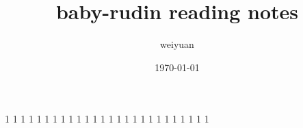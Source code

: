 
\title{baby-rudin reading notes}
\author{weiyuan}
\date{\today}


    \frontmatter
    \maketitle
    \tableofcontents
    \mainmatter
    
    
    
    
    
    
    
    
    
    
    
    
    
    1\cite{ARTIN1964}
    1\cite{BOAS1960}
    1\cite{BUCK1962}
    1\cite{unknown1965AdvancedCalculus}
    1\cite{BURKILL1951}
    1\cite{DIEUDONNE1960}
    1\cite{FLEMING1965}
    1\cite{GRAVES1956}
    1\cite{HALMOS1950}
    1\cite{unknown1958Finite-dimensionalVectorSpaces}
    1\cite{HARDY1947}
    1\cite{ROGOSINSKI1950}
    1\cite{HERSTEIN1964}
    1\cite{HEWITT1965}
    1\cite{KELLOGG1940}
    1\cite{KNOPP1928}
    1\cite{LANDAU1951}
    1\cite{MCSHANE1944}
    1\cite{NIVEN1956}
    1\cite{ROYDEN1963}
    1\cite{RUDIN1974_bigrudin}
    1\cite{SIMMONS1963}
    1\cite{SINGER1967}
    1\cite{SMITH1971}
    1\cite{SPIVAK1965}
    1\cite{THURSTON1956}

    
    
